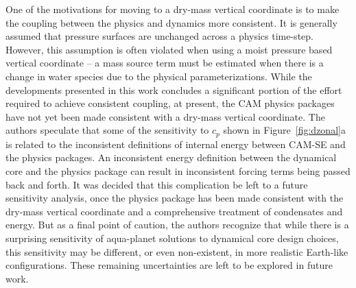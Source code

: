 \documentclass{agujournal}
\begin{document}
One of the motivations for moving to a dry-mass vertical coordinate is to make the coupling between the physics and dynamics more consistent. It is generally assumed that pressure surfaces are unchanged across a physics time-step. However, this assumption is often violated when using a moist pressure based vertical coordinate -- a mass source term must be estimated when there is a change in water species due to the physical parameterizations. While the developments presented in this work concludes a significant portion of the effort required to achieve consistent coupling, at present, the CAM physics packages have not yet been made consistent with a dry-mass vertical coordinate. The authors speculate that some of the sensitivity to $c_p$ shown in Figure~\ref{fig:dzonal}a is related to the inconsistent definitions of internal energy between CAM-SE and the physics packages. An inconsistent energy definition between the dynamical core and the physics package can result in inconsistent forcing terms being passed back and forth. It was decided that this complication be left to a future sensitivity analysis, once the physics package has been made consistent with the dry-mass vertical coordinate and a comprehensive treatment of condensates and energy. But as a final point of caution, the authors recognize that while there is a surprising sensitivity of aqua-planet solutions to dynamical core design choices, this sensitivity may be different, or even non-existent, in more realistic Earth-like configurations. These remaining uncertainties are left to be explored in future work.
\end{document}
